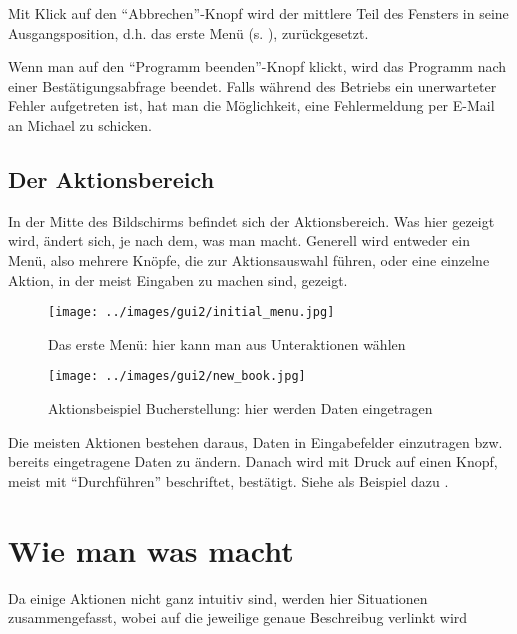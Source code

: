 Mit Klick auf den ``Abbrechen''-Knopf wird der mittlere Teil des Fensters in seine Ausgangsposition, d.h. das erste Menü (s. ), zurückgesetzt.

Wenn man auf den ``Programm beenden''-Knopf klickt, wird das Programm nach einer Bestätigungsabfrage beendet. Falls während des Betriebs ein unerwarteter Fehler aufgetreten ist, hat man die Möglichkeit, eine Fehlermeldung per E-Mail an Michael zu schicken.

\subsection{Der Aktionsbereich}
\label{subsec:interface:action_center}
In der Mitte des Bildschirms befindet sich der Aktionsbereich. Was hier gezeigt wird, ändert sich, je nach dem, was man macht.
Generell wird entweder ein Menü, also mehrere Knöpfe, die zur Aktionsauswahl führen, oder eine einzelne Aktion, in der meist Eingaben zu machen sind, gezeigt.

\begin{figure}\texttt{[image: ../images/gui2/initial\_menu.jpg]}\caption{Das erste Menü: hier kann man aus Unteraktionen wählen}\label{fig:initial_menu}\end{figure}
\begin{figure}\texttt{[image: ../images/gui2/new\_book.jpg]}\caption{Aktionsbeispiel Bucherstellung: hier werden Daten eingetragen}\label{fig:new_book_example}\end{figure}

Die meisten Aktionen bestehen daraus, Daten in Eingabefelder einzutragen bzw. bereits eingetragene Daten zu ändern. Danach wird mit Druck auf einen Knopf, meist mit ``Durchführen'' beschriftet, bestätigt. Siehe als Beispiel dazu .

\section{Wie man was macht}
\label{sec:howto}
Da einige Aktionen nicht ganz intuitiv sind, werden hier Situationen zusammengefasst, wobei auf die jeweilige genaue Beschreibug verlinkt wird

